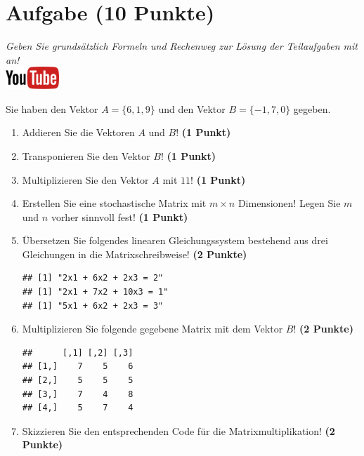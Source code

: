 \documentclass[a4paper, 10pt]{scrartcl}\usepackage[]{graphicx}\usepackage[]{xcolor}
\makeatletter
\newenvironment{kframe}{%
 \def\at@end@of@kframe{}%
 \ifinner\ifhmode%
  \def\at@end@of@kframe{\end{minipage}}%
  \begin{minipage}{\columnwidth}%
 \fi\fi%
 \def\FrameCommand##1{\hskip\@totalleftmargin \hskip-\fboxsep
 \colorbox{shadecolor}{##1}\hskip-\fboxsep
     \hskip-\linewidth \hskip-\@totalleftmargin \hskip\columnwidth}%
 \MakeFramed {\advance\hsize-\width
   \@totalleftmargin\z@ \linewidth\hsize
   \@setminipage}}%
 {\par\unskip\endMakeFramed%
 \at@end@of@kframe}
\newenvironment{knitrout}{}{} %
\makeatother
\begin{document}
  
\clearpage

\section{Aufgabe \hfill (10 Punkte)}

\textit{Geben Sie grunds{\"a}tzlich Formeln und Rechenweg zur L{\"o}sung der
  Teilaufgaben mit an!} \\[1Ex]

\hfill\href{https://youtu.be/x_MwWJoEsME}{\includegraphics[width =
  2cm]{img/youtube}} %
\hspace{2Ex}



Sie haben den Vektor $A = \{6, 1, 9\}$ und den Vektor $B = \{-1, 7, 0\}$ gegeben.

\begin{enumerate}
\item Addieren Sie die Vektoren $A$ und $B$! \textbf{(1 Punkt)}
\item Transponieren Sie den Vektor $B$!
  \textbf{(1 Punkt)} 
\item Multiplizieren Sie den Vektor $A$ mit
  $11$! \textbf{(1 Punkt)}
\item Erstellen Sie eine stochastische Matrix mit $m \times n$ Dimensionen!
  Legen Sie $m$ und $n$ vorher sinnvoll fest! \textbf{(1 Punkt)}
\item {\"U}bersetzen Sie folgendes linearen Gleichungssystem bestehend aus drei
  Gleichungen in die Matrixschreibweise! \textbf{(2 Punkte)}
\begin{knitrout}
\color{fgcolor}\begin{kframe}
\begin{verbatim}
## [1] "2x1 + 6x2 + 2x3 = 2"
## [1] "2x1 + 7x2 + 10x3 = 1"
## [1] "5x1 + 6x2 + 2x3 = 3"
\end{verbatim}
\end{kframe}
\end{knitrout}
\item Multiplizieren Sie folgende gegebene Matrix mit dem Vektor $B$!
  \textbf{(2 Punkte)}
\begin{knitrout}
\color{fgcolor}\begin{kframe}
\begin{verbatim}
##      [,1] [,2] [,3]
## [1,]    7    5    6
## [2,]    5    5    5
## [3,]    7    4    8
## [4,]    5    7    4
\end{verbatim}
\end{kframe}
\end{knitrout}
\item Skizzieren Sie den entsprechenden \Rlogo Code f{\"u}r die
  Matrixmultiplikation! \textbf{(2 Punkte)}
\end{enumerate}
 
\end{document}
